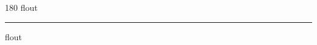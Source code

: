 
\begin{frame}
\begin{center}
\begin{turn}{180}
{\fontsize{2.5cm}{1em}\selectfont flout}
\end{turn}
\vspace{1em}\par  
\hrule
\vspace{1em}\par  
{\fontsize{2.5cm}{1em}\selectfont flout}
\end{center}
\end{frame}
